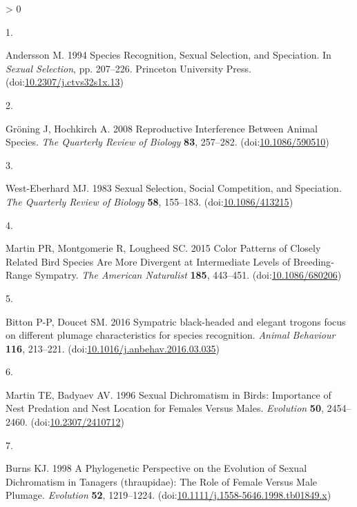 \documentclass[
  a4paper,
]{article}
\newlength{\cslhangindent}
\newlength{\csllabelwidth}
\newenvironment{CSLReferences}[2] %
 {%
  \setlength{\parindent}{0pt}
  \ifodd #1 \everypar{\setlength{\hangindent}{\cslhangindent}}\ignorespaces\fi
  \ifnum #2 > 0
  \setlength{\parskip}{#2\baselineskip}
  \fi
 }%
 {}
\newcommand{\CSLLeftMargin}[1]{\parbox[t]{\csllabelwidth}{#1}}
\newcommand{\CSLRightInline}[1]{\parbox[t]{\linewidth - \csllabelwidth}{#1}\break}
\begin{document}
\hypertarget{refs}{}
\begin{CSLReferences}{0}{0}
\leavevmode\hypertarget{ref-andersson1994}{}%
\CSLLeftMargin{1. }
\CSLRightInline{Andersson M. 1994 Species {Recognition}, {Sexual
Selection}, and {Speciation}. In \emph{Sexual {Selection}}, pp.
207--226. {Princeton University Press}.
(doi:\href{https://doi.org/10.2307/j.ctvs32s1x.13}{10.2307/j.ctvs32s1x.13})}

\leavevmode\hypertarget{ref-groning2008}{}%
\CSLLeftMargin{2. }
\CSLRightInline{Gröning J, Hochkirch A. 2008 Reproductive {Interference
Between Animal Species}. \emph{The Quarterly Review of Biology}
\textbf{83}, 257--282.
(doi:\href{https://doi.org/10.1086/590510}{10.1086/590510})}

\leavevmode\hypertarget{ref-west-eberhard1983}{}%
\CSLLeftMargin{3. }
\CSLRightInline{West-Eberhard MJ. 1983 Sexual {Selection}, {Social
Competition}, and {Speciation}. \emph{The Quarterly Review of Biology}
\textbf{58}, 155--183.
(doi:\href{https://doi.org/10.1086/413215}{10.1086/413215})}

\leavevmode\hypertarget{ref-martin2015a}{}%
\CSLLeftMargin{4. }
\CSLRightInline{Martin PR, Montgomerie R, Lougheed SC. 2015 Color
{Patterns} of {Closely Related Bird Species Are More Divergent} at
{Intermediate Levels} of {Breeding}-{Range Sympatry}. \emph{The American
Naturalist} \textbf{185}, 443--451.
(doi:\href{https://doi.org/10.1086/680206}{10.1086/680206})}

\leavevmode\hypertarget{ref-bitton2016}{}%
\CSLLeftMargin{5. }
\CSLRightInline{Bitton P-P, Doucet SM. 2016 Sympatric black-headed and
elegant trogons focus on different plumage characteristics for species
recognition. \emph{Animal Behaviour} \textbf{116}, 213--221.
(doi:\href{https://doi.org/10.1016/j.anbehav.2016.03.035}{10.1016/j.anbehav.2016.03.035})}

\leavevmode\hypertarget{ref-martin1996}{}%
\CSLLeftMargin{6. }
\CSLRightInline{Martin TE, Badyaev AV. 1996 Sexual {Dichromatism} in
{Birds}: {Importance} of {Nest Predation} and {Nest Location} for
{Females Versus Males}. \emph{Evolution} \textbf{50}, 2454--2460.
(doi:\href{https://doi.org/10.2307/2410712}{10.2307/2410712})}

\leavevmode\hypertarget{ref-burns1998}{}%
\CSLLeftMargin{7. }
\CSLRightInline{Burns KJ. 1998 A {Phylogenetic Perspective} on the
{Evolution} of {Sexual Dichromatism} in {Tanagers} (thraupidae): {The
Role} of {Female Versus Male Plumage}. \emph{Evolution} \textbf{52},
1219--1224.
(doi:\href{https://doi.org/10.1111/j.1558-5646.1998.tb01849.x}{10.1111/j.1558-5646.1998.tb01849.x})}


\end{CSLReferences}
\end{document}
